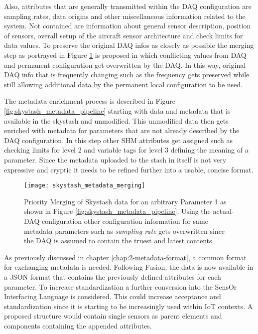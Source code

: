 Also, attributes that are generally transmitted within the DAQ configuration are sampling rates, data origins and other miscellaneous information related to the system. Not contained are information about general sensor description, position of sensors, overall setup of the aircraft sensor architecture and check limits for data values. To preserve the original DAQ infos as closely as possible the merging step as portrayed in Figure \ref{fig:skystash_metadata_merging} is proposed in which conflicting values from DAQ and permanent configuration get overwritten by the DAQ. In this way, original DAQ info that is frequently changing such as the frequency gets preserved while still allowing additional data by the permanent local configuration to be used.

The metadata enrichment process is described in Figure \ref{fig:skystash_metadata_pipeline} starting with data and metadata that is available in the skystash and unmodified. This unmodified data then gets enriched with metadata for parameters that are not already described by the DAQ configuration. In this step other SHM attributes get assigned such as checking limits for level 2 and variable tags for level 3 defining the meaning of a parameter. Since the metadata uploaded to the stash in itself is not very expressive and cryptic it needs to be refined further into a usable, concise format.
\begin{figure}
    \centering
    \texttt{[image: skystash\_metadata\_merging]}
    \caption[SHM Configuration Priority Merging]{Priority Merging of Skystash data for an arbitrary Parameter 1 as shown in Figure \ref{fig:skystash_metadata_pipeline}. Using the actual-DAQ configuration other configuration information for same metadata parameters such as \textit{sampling rate} gets overwritten since the DAQ is assumed to contain the truest and latest contents.}
    \label{fig:skystash_metadata_merging}
\end{figure}


As previously discussed in chapter \ref{chap:2-metadata-format}, a common format for exchanging metadata is needed. Following Fusion, the data is now available in a JSON format that contains the previously defined attributes for each parameter. To increase standardization a further conversion into the SensOr Interfacing Language is considered. This could increase acceptance and standardization since it is starting to be increasingly used within IoT contexts. A proposed structure would contain single sensors as parent elements and components containing the appended attributes. \cite{behrens_domain-specific_2021}

